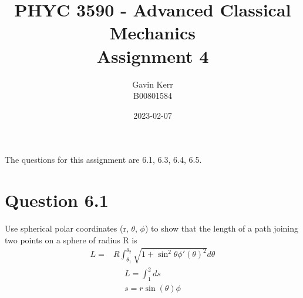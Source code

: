 \documentclass[12pt, a4paper]{article}
\title{PHYC 3590 - Advanced Classical Mechanics\\Assignment 4}
\author{Gavin Kerr\\B00801584}
\date{2023-02-07}
\begin{document}
\maketitle
The questions for this assignment are 6.1, 6.3, 6.4, 6.5.

\section{Question 6.1}
Use spherical polar coordinates (r, $\theta$, $\phi$) to show that the length of a path joining two points on a
sphere of radius R is
\begin{align}
L =& R\int_{\theta_1}^{\theta_2}\sqrt{1+\sin^2\theta\phi'(\theta)^2}d\theta
\end{align}
\begin{align}
L = \int_1^2ds
\\
s = r\sin(\theta) \phi
\end{align}
\end{document}
